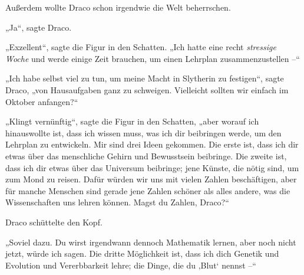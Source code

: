 Außerdem wollte Draco schon irgendwie die Welt beherrschen.

„Ja“, sagte Draco.

„Exzellent“, sagte die Figur in den Schatten. „Ich hatte eine recht \emph{stressige Woche} und werde einige Zeit brauchen, um einen Lehrplan zusammenzustellen –“

„Ich habe selbst viel zu tun, um meine Macht in Slytherin zu festigen“, sagte Draco, „von Hausaufgaben ganz zu schweigen. Vielleicht sollten wir einfach im Oktober anfangen?“

„Klingt vernünftig“, sagte die Figur in den Schatten, „aber worauf ich hinauswollte ist, dass ich wissen muss, was ich dir beibringen werde, um den Lehrplan zu entwickeln. Mir sind drei Ideen gekommen. Die erste ist, dass ich dir etwas über das menschliche Gehirn und Bewusstsein beibringe. Die zweite ist, dass ich dir etwas über das Universum beibringe; jene Künste, die nötig sind, um zum Mond zu reisen. Dafür würden wir uns mit vielen Zahlen beschäftigen, aber für manche Menschen sind gerade jene Zahlen schöner als alles andere, was die Wissenschaften uns lehren können. Magst du Zahlen, Draco?“

Draco schüttelte den Kopf.

„Soviel dazu. Du wirst irgendwann dennoch Mathematik lernen, aber noch nicht jetzt, würde ich sagen. Die dritte Möglichkeit ist, dass ich dich Genetik und Evolution und Vererbbarkeit lehre; die Dinge, die du ‚Blut‘ nennst –“

